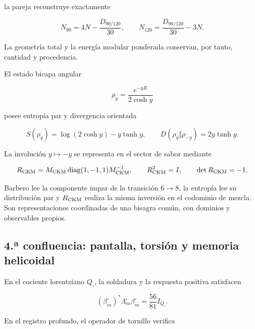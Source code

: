 la pareja reconstruye exactamente

\begin{equation}
 N_{90}=4N-\frac{D_{90/120}}{30},
 \qquad
 N_{120}=\frac{D_{90/120}}{30}-3N.
 \label{rm:eq:confluence-sector-reconstruction}
\end{equation}

La geometr\'ia total y la energ\'ia modular ponderada conservan, por tanto,
cantidad y procedencia.

El estado bicapa angular

\begin{equation}
 \rho_y=\frac{e^{-yR}}{2\cosh y}
 \label{rm:eq:confluence-rhoy}
\end{equation}

posee entrop\'ia par y divergencia orientada

\begin{equation}
 S(\rho_y)=\log(2\cosh y)-y\tanh y,
 \qquad
 D(\rho_y\Vert\rho_{-y})=2y\tanh y.
 \label{rm:eq:confluence-info-orientation}
\end{equation}

La involuci\'on \(y\mapsto-y\) se representa en el sector de sabor mediante

\begin{equation}
 R_{\rm CKM}
 =M_{\rm CKM}\operatorname{diag}(1,-1,1)M_{\rm CKM}^{-1},
 \qquad
 R_{\rm CKM}^2=I,
 \qquad
 \det R_{\rm CKM}=-1.
 \label{rm:eq:confluence-rckm}
\end{equation}

Barbero lee la componente impar de la transici\'on \(6\to8\), la entrop\'ia
lee su distribuci\'on par y \(R_{\rm CKM}\) realiza la misma inversi\'on en el
codominio de mezcla.  Son representaciones coordinadas de una bisagra com\'un,
con dominios y observables propios.

\subsection{4.ª confluencia: pantalla, torsión y memoria helicoidal}

En el cociente lorentziano \(Q_{\square}\), la soldadura y la respuesta
positiva satisfacen

\begin{equation}
 \boxed{
 (\beta_m^{\square})^*\Lambda_m^{\square}\beta_m^{\square}
 =\frac{56}{81}I_{Q_{\square}}.}
 \label{rm:eq:confluence-screen-energy}
\end{equation}

En el registro profundo, el operador de tornillo verifica


